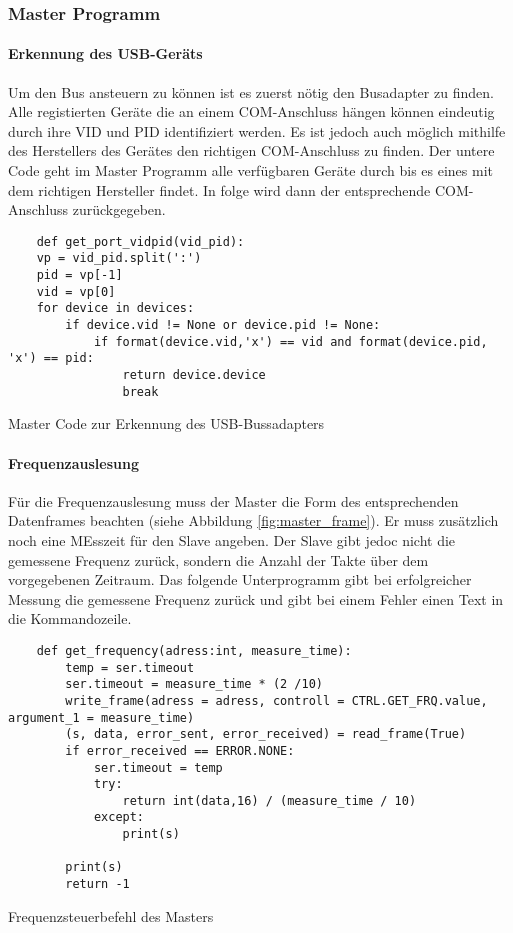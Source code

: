 \subsubsection{Master Programm}

\paragraph{Erkennung des USB-Geräts}\mbox{} 

Um den Bus ansteuern zu können ist es zuerst nötig den Busadapter zu finden. Alle registierten Geräte die an einem COM-Anschluss hängen können eindeutig durch ihre VID und PID identifiziert werden. 
Es ist jedoch auch möglich mithilfe des Herstellers des Gerätes den richtigen COM-Anschluss zu finden. Der untere Code geht im Master Programm alle verfügbaren Geräte durch bis es eines mit dem richtigen Hersteller findet.
In folge wird dann der entsprechende COM-Anschluss zurückgegeben.

\begin{listing}[H]
    \begin{verbatim}
    def get_port_vidpid(vid_pid):
    vp = vid_pid.split(':')
    pid = vp[-1]
    vid = vp[0]
    for device in devices:
        if device.vid != None or device.pid != None:
            if format(device.vid,'x') == vid and format(device.pid, 'x') == pid:
                return device.device
                break
    \end{verbatim}
    \caption{Master Code zur Erkennung des USB-Bussadapters}
\end{listing}


\paragraph{Frequenzauslesung}\mbox{} 

Für die Frequenzauslesung muss der Master die Form des entsprechenden Datenframes beachten (siehe Abbildung \ref{fig:master_frame}). Er muss zusätzlich noch eine MEsszeit für den Slave angeben. Der Slave gibt jedoc nicht die gemessene
Frequenz zurück, sondern die Anzahl der Takte über dem vorgegebenen Zeitraum. Das folgende Unterprogramm gibt bei erfolgreicher Messung die gemessene Frequenz zurück und gibt bei einem Fehler einen Text in die Kommandozeile.


\begin{listing}[H]
    \begin{verbatim}
    def get_frequency(adress:int, measure_time):
        temp = ser.timeout
        ser.timeout = measure_time * (2 /10)
        write_frame(adress = adress, controll = CTRL.GET_FRQ.value, argument_1 = measure_time)
        (s, data, error_sent, error_received) = read_frame(True)
        if error_received == ERROR.NONE:
            ser.timeout = temp
            try:
                return int(data,16) / (measure_time / 10)
            except:
                print(s)

        print(s)
        return -1
    \end{verbatim}
    \caption{Frequenzsteuerbefehl des Masters}
\end{listing}
